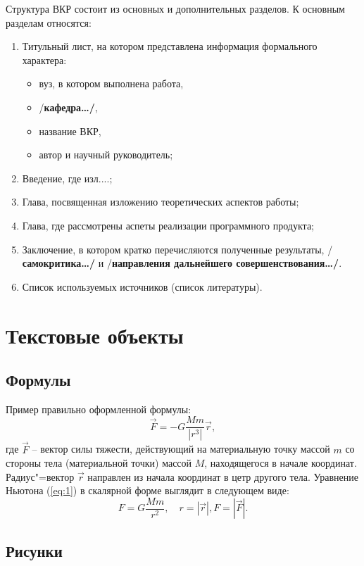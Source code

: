 \documentclass[a4paper,14pt,final]{extreport}
\newcommand{\aaa}[1]{{/\bfseries #1\ldots/}}
\begin{document}
Структура ВКР состоит из основных и дополнительных разделов.  К основным разделам относятся:
\begin{enumerate}
\item Титульный лист, на котором представлена информация формального характера:
  \begin{itemize}
  \item вуз, в котором выполнена работа,
  \item \aaa{кафедра},
  \item название ВКР,
  \item автор и научный руководитель;
  \end{itemize}
\item Введение, где изл....;
\item Глава, посвященная изложению теоретических аспектов работы;
\item Глава, где рассмотрены аспеты реализации программного продукта;
\item Заключение, в котором кратко перечисляются полученные результаты, \aaa{самокритика} и \aaa{направления дальнейшего совершенствования}.
\item Список используемых источников (список литературы).
\end{enumerate}

\section{Текстовые объекты}
\label{sec:objs}

\subsection{Формулы}
\label{sec:formulae}

Пример правильно оформленной формулы:
\begin{equation}
  \label{eq:1}
  \vec{F} = -G\frac{Mm}{|r^3|}\vec{r},
\end{equation}
где $\vec{F}$ -- вектор силы тяжести, действующий на материальную точку массой $m$ со стороны тела (материальной точки) массой $M$, находящегося в начале координат.  Радиус"=вектор $\vec{r}$ направлен из начала координат в цетр другого тела.  Уравнение Ньютона (\ref{eq:1}) в скалярной форме выглядит в следующем виде:
\begin{equation*}
  F=G\frac{Mm}{r^2},\quad r=|\vec{r}|, F=|\vec{F}|.
\end{equation*}

\subsection{Рисунки}
\label{sec:figures}
\end{document}
